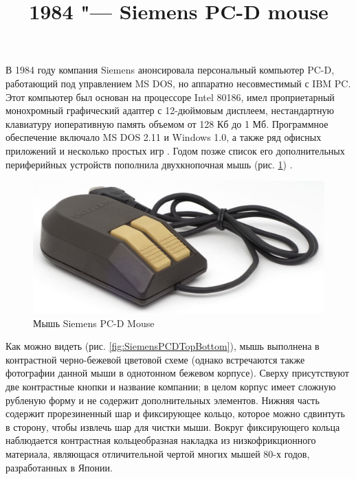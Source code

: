 \documentclass[11pt, a4paper]{article}
\begin{document}
\title{1984 "--- Siemens PC-D mouse}
\date{}
\maketitle
{}
В 1984 году компания Siemens анонсировала персональный компьютер PC-D, работающий под управлением MS DOS, но аппаратно несовместимый с IBM PC. Этот компьютер был основан на процессоре Intel 80186, имел проприетарный монохромный графический адаптер с 12-дюймовым дисплеем, нестандартную клавиатуру иоперативную память объемом от 128 Кб до 1 Мб. Программное обеспечение включало MS DOS 2.11 и Windows 1.0, а также ряд офисных приложений и несколько простых игр \cite{wiki}. Годом позже список его дополнительных периферийных устройств пополнила двухкнопочная мышь (рис. \ref{fig:SiemensPCDPic}) \cite{blog}.

\begin{figure}[h]
    \centering
    \includegraphics[scale=0.6]{1985_siemens_pcd_mouse/pic_30.jpg}
    \caption{Мышь Siemens PC-D Mouse}
    \label{fig:SiemensPCDPic}
\end{figure}

Как можно видеть (рис. \ref{fig:SiemensPCDTopBottom}), мышь выполнена в контрастной черно-бежевой цветовой схеме (однако встречаются также фотографии данной мыши в однотонном бежевом корпусе). Сверху присутствуют две контрастные кнопки и название компании; в целом корпус имеет сложную рубленую форму и не содержит дополнительных элементов. Нижняя часть содержит прорезиненный шар и фиксирующее кольцо, которое можно сдвинтуть в сторону, чтобы извлечь шар для чистки мыши. Вокруг фиксирующего кольца наблюдается контрастная кольцеобразная накладка из низкофрикционного материала, являющася отличительной чертой многих мышей 80-х годов, разработанных в Японии.
\end{document}
